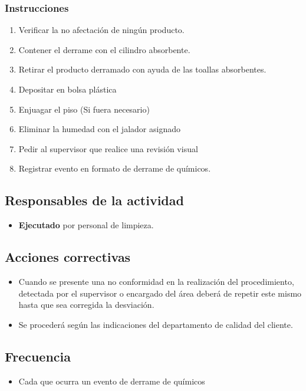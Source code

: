 \subsubsection{Instrucciones}
\begin{enumerate}
	\item Verificar la no afectación de ningún producto.
	\item Contener el derrame con el cilindro absorbente.
	\item Retirar el producto derramado con ayuda de las toallas absorbentes.
	\item Depositar en bolsa plástica
	\item Enjuagar el piso (Si fuera necesario)
	\item Eliminar la humedad con el jalador asignado
	\item Pedir al supervisor que realice una revisión visual
	\item Registrar evento en formato de derrame de químicos.
\end{enumerate}

\subsection{Responsables de la actividad}
\begin{itemize}
	\item \textbf{Ejecutado} por personal de limpieza.
\end{itemize}

\subsection{Acciones correctivas}
\begin{itemize}
	\item Cuando se presente una no conformidad en la realización del procedimiento, detectada por el supervisor o encargado del área deberá de repetir este mismo hasta que sea corregida la desviación.
	\item Se procederá según las indicaciones del departamento de calidad del cliente.
\end{itemize}

\subsection{Frecuencia}
\begin{itemize}
	\item Cada que ocurra un evento de derrame de químicos
\end{itemize}

